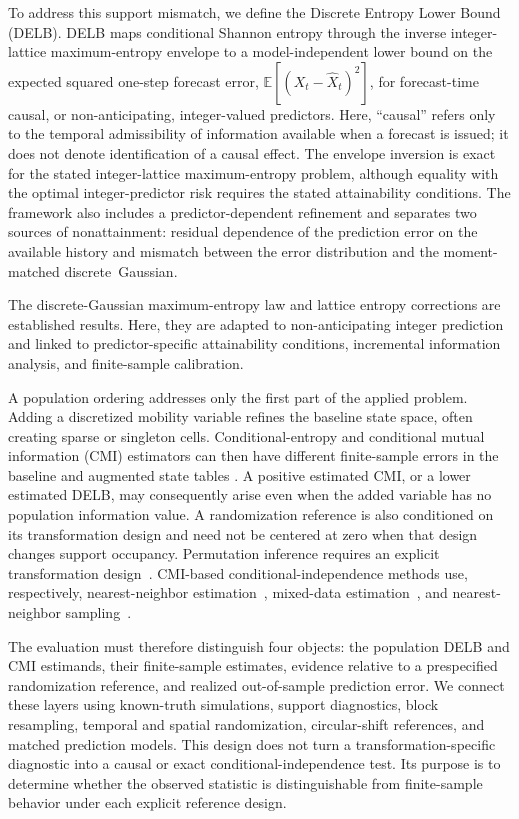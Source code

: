 \documentclass[applsci,article,accept,moreauthors]{Definitions/mdpi}
\begin{document}
To address this support mismatch, we define the Discrete Entropy Lower
Bound (DELB). DELB maps conditional Shannon entropy through the inverse
integer-lattice maximum-entropy envelope to a model-independent lower bound on
{the expected squared one-step forecast error,
\(\mathbb E[(X_t-\widehat X_t)^2]\),} for forecast-time causal, or
non-anticipating, integer-valued predictors. Here, ``causal'' refers only to the temporal
admissibility of information available when a forecast is issued; it does not
denote identification of a causal effect. The envelope inversion is exact for
the stated integer-lattice maximum-entropy problem, although equality with
the optimal integer-predictor risk requires the stated attainability
conditions. The framework also includes a predictor-dependent refinement and
separates two sources of nonattainment: residual dependence of the prediction
error on the available history and mismatch between the error distribution
and the moment-matched discrete~Gaussian.

The discrete-Gaussian maximum-entropy law and lattice entropy corrections are
established results. Here, they are adapted to non-anticipating integer
prediction and linked to predictor-specific attainability conditions,
incremental information analysis, and finite-sample calibration.

A population ordering addresses only the first part of the applied problem. Adding
a discretized mobility variable refines the baseline state space, often
creating sparse or singleton cells. Conditional-entropy and conditional
mutual information (CMI) estimators can then have different finite-sample
errors in the baseline and augmented state tables
\citep{paninski2003}. A positive estimated CMI, or a
lower estimated DELB, may consequently arise even when the added variable has
no population information value. A randomization reference is also
conditioned on its transformation design and need not be centered at zero
when that design changes support occupancy. Permutation inference requires an
explicit transformation design~\citep{ernst2004permutation}. CMI-based
conditional-independence methods use, respectively, nearest-neighbor
estimation~\citep{runge2018cmi}, mixed-data estimation~\citep{zan2022cmi},
and nearest-neighbor sampling~\citep{li2023nncit}.

The evaluation must therefore distinguish four objects: the population
DELB and CMI estimands, their finite-sample estimates, evidence relative to a
prespecified randomization reference, and realized out-of-sample prediction
error. We connect these layers using known-truth simulations, support
diagnostics, block resampling, temporal and spatial randomization,
circular-shift references, and matched prediction models. This design does
not turn a transformation-specific diagnostic into a causal or exact
conditional-independence test. Its purpose is to determine whether the
observed statistic is distinguishable from finite-sample behavior under each
explicit reference design.
\end{document}

